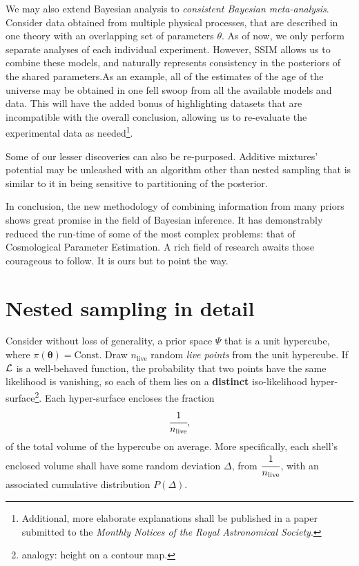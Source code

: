 \documentclass[usenatbib]{mnras}
\begin{document}
We may also extend Bayesian analysis to \emph{consistent Bayesian
  meta-analysis}. Consider data obtained from multiple physical
processes, that are described in one theory with an overlapping set of
parameters $\theta$. As of now, we only perform separate analyses of
each individual experiment. However, SSIM allows us to combine these
models, and naturally represents consistency in the posteriors of the
shared parameters.As an example, all of the estimates of the age of
the universe may be obtained in one fell swoop from all the available
models and data. This will have the added bonus of highlighting
datasets that are incompatible with the overall conclusion, allowing
us to re-evaluate the experimental data as needed\footnote{Additional,
  more elaborate explanations shall be published in a paper submitted
  to the \emph{Monthly Notices of the Royal Astronomical Society}.}.

Some of our lesser discoveries can also be re-purposed. Additive
mixtures' potential may be unleashed with an algorithm other than
nested sampling that is similar to it in being sensitive to
partitioning of the posterior.

In conclusion, the new methodology of combining information from many
priors shows great promise in the field of Bayesian inference. It has
demonstrably reduced the run-time of some of the most complex
problems: that of Cosmological Parameter Estimation. A rich field of
research awaits those courageous to follow. It is ours but to point
the way.




\appendix

\section{Nested sampling in detail}\label{sec:ns}
Consider without loss of generality, a prior space \(\Psi\) that is a
unit hypercube, where \(\pi(\bm{\theta}) = \text{Const.}\) Draw
\(n_\text{live}\) random \emph{live points} from the unit
hypercube. If \({\cal L}\) is a well-behaved function, the probability
that two points have the same likelihood is vanishing, so each of them
lies on a \textbf{distinct} iso-likelihood
hyper-surface\footnote{analogy: height on a contour map. }. Each
hyper-surface encloses the fraction
\begin{equation}
\cfrac{1}{n_\text{live}},
\end{equation}
of the total volume of the hypercube on average. More specifically,
each shell's enclosed volume shall have some random deviation \(\Delta\), from
\(\cfrac{1}{n_\text{live}}\), with an associated cumulative
distribution \(P(\Delta)\).
\end{document}
